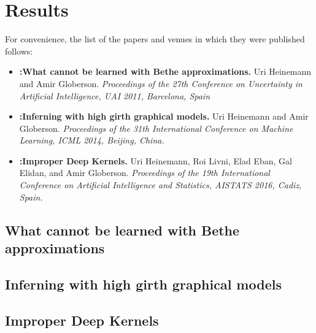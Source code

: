 \chapter{Results}
For convenience, the list of the papers and venues in which they were published follows:

\begin{itemize}
\item 
\textbf{:What cannot be learned with Bethe approximations.}
Uri Heinemann and  Amir Globerson.
\emph{Proceedings of the 27th Conference on Uncertainty in Artificial Intelligence, UAI 2011, Barcelona, Spain}

\item \textbf{:Inferning with high girth graphical models.}
Uri Heinemann and  Amir Globerson.
\emph{Proceedings of the 31th International Conference on Machine Learning, ICML 2014, Beijing, China.}

\item \textbf{:Improper Deep Kernels.}
Uri Heinemann, Roi Livni, Elad Eban, Gal Elidan, and Amir Globerson.
\emph{Proceedings of the 19th International Conference on Artificial Intelligence and Statistics, AISTATS 2016, Cadiz, Spain.}

\end{itemize} 


\newpage
\section{What cannot be learned with Bethe approximations}
\label{sec:lwbethe}

\newpage
\section{Inferning with high girth graphical models}
\label{sec:lg}

\newpage
\section{Improper Deep Kernels}
\label{sec:impnet}

